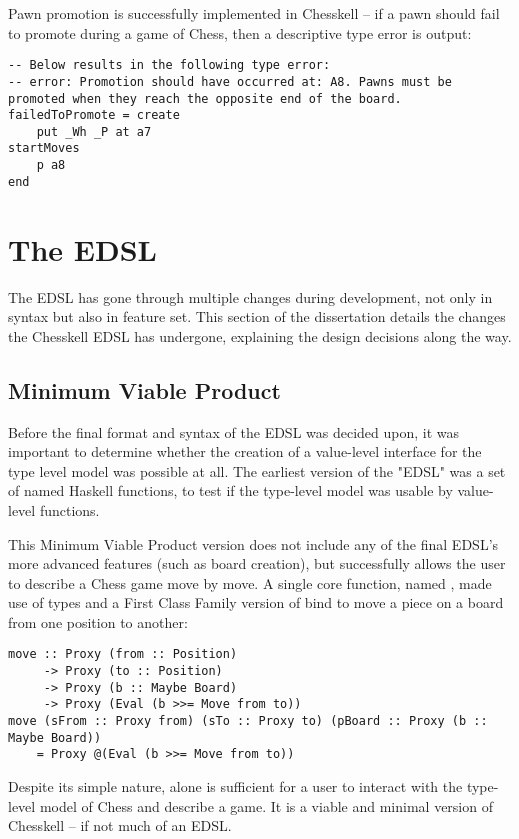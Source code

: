 Pawn promotion is successfully implemented in Chesskell -- if a pawn should fail to promote during a game of Chess, then a descriptive type error is output:

\begin{lstlisting}
-- Below results in the following type error:
-- error: Promotion should have occurred at: A8. Pawns must be promoted when they reach the opposite end of the board.
failedToPromote = create
    put _Wh _P at a7
startMoves
    p a8
end
\end{lstlisting}

\section{The EDSL}

The EDSL has gone through multiple changes during development, not only in syntax but also in feature set. This section of the dissertation details the changes the Chesskell EDSL has undergone, explaining the design decisions along the way.

\subsection{Minimum Viable Product}

Before the final format and syntax of the EDSL was decided upon, it was important to determine whether the creation of a value-level interface for the type level model was possible at all. The earliest version of the "EDSL" was a set of named Haskell functions, to test if the type-level model was usable by value-level functions.

This Minimum Viable Product version does not include any of the final EDSL's more advanced features (such as board creation), but successfully allows the user to describe a Chess game move by move. A single core function, named , made use of  types and a First Class Family version of bind to move a piece on a board from one position to another:

\begin{lstlisting}
move :: Proxy (from :: Position)
     -> Proxy (to :: Position)
     -> Proxy (b :: Maybe Board)
     -> Proxy (Eval (b >>= Move from to))
move (sFrom :: Proxy from) (sTo :: Proxy to) (pBoard :: Proxy (b :: Maybe Board))
    = Proxy @(Eval (b >>= Move from to))
\end{lstlisting}

Despite its simple nature,  alone is sufficient for a user to interact with the type-level model of Chess and describe a game. It is a viable and minimal version of Chesskell -- if not much of an EDSL.

